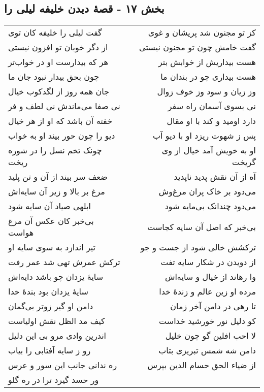 \begin{center}
\section*{بخش ۱۷ - قصهٔ دیدن خلیفه لیلی را}
\label{sec:sh017}
\begin{longtable}{l p{0.5cm} r}
گفت لیلی را خلیفه کان توی
&&
کز تو مجنون شد پریشان و غوی
\\
از دگر خوبان تو افزون نیستی
&&
گفت خامش چون تو مجنون نیستی
\\
هر که بیدارست او در خواب‌تر
&&
هست بیداریش از خوابش بتر
\\
چون بحق بیدار نبود جان ما
&&
هست بیداری چو در بندان ما
\\
جان همه روز از لگدکوب خیال
&&
وز زیان و سود وز خوف زوال
\\
نی صفا می‌ماندش نی لطف و فر
&&
نی بسوی آسمان راه سفر
\\
خفته آن باشد که او از هر خیال
&&
دارد اومید و کند با او مقال
\\
دیو را چون حور بیند او به خواب
&&
پس ز شهوت ریزد او با دیو آب
\\
چونک تخم نسل را در شوره ریخت
&&
او به خویش آمد خیال از وی گریخت
\\
ضعف سر بیند از آن و تن پلید
&&
آه از آن نقش پدید ناپدید
\\
مرغ بر بالا و زیر آن سایه‌اش
&&
می‌دود بر خاک پران مرغ‌وش
\\
ابلهی صیاد آن سایه شود
&&
می‌دود چندانک بی‌مایه شود
\\
بی‌خبر کان عکس آن مرغ هواست
&&
بی‌خبر که اصل آن سایه کجاست
\\
تیر اندازد به سوی سایه او
&&
ترکشش خالی شود از جست و جو
\\
ترکش عمرش تهی شد عمر رفت
&&
از دویدن در شکار سایه تفت
\\
سایهٔ یزدان چو باشد دایه‌اش
&&
وا رهاند از خیال و سایه‌اش
\\
سایهٔ یزدان بود بندهٔ خدا
&&
مرده او زین عالم و زندهٔ خدا
\\
دامن او گیر زوتر بی‌گمان
&&
تا رهی در دامن آخر زمان
\\
کیف مد الظل نقش اولیاست
&&
کو دلیل نور خورشید خداست
\\
اندرین وادی مرو بی این دلیل
&&
لا احب افلین گو چون خلیل
\\
رو ز سایه آفتابی را بیاب
&&
دامن شه شمس تبریزی بتاب
\\
ره ندانی جانب این سور و عرس
&&
از ضیاء الحق حسام الدین بپرس
\\
ور حسد گیرد ترا در ره گلو

\end{longtable}
\end{center}
